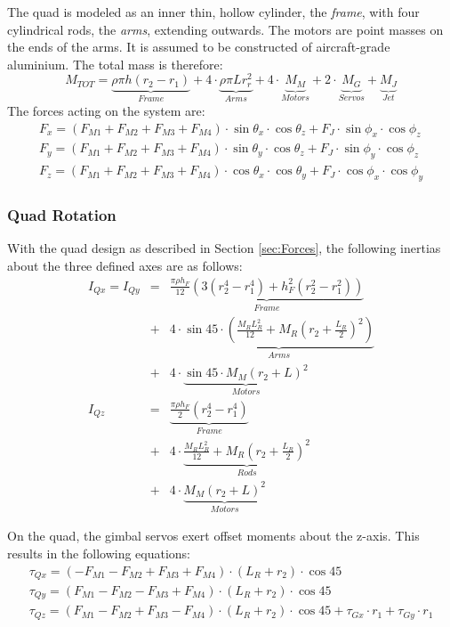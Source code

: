 \documentclass[11pt]{article}
\begin{document}
The quad is modeled as an inner thin, hollow cylinder, the \emph{frame}, with four cylindrical rods, the \emph{arms}, extending outwards. The motors are point masses on the ends of the arms. It is assumed to be constructed of aircraft-grade aluminium. The total mass is therefore:
\begin{equation}
    M_{TOT} = \underbrace{\rho\pi h (r_2-r_1)}_{Frame} + 4\cdot\underbrace{\rho\pi L r_r^2}_{Arms} + 4\cdot\underbrace{M_M}_{Motors} + 2\cdot\underbrace{M_G}_{Servos} + \underbrace{M_J}_{Jet} \label{eqn:total_mass}
\end{equation}
The forces acting on the system are:
\begin{eqnarray}
    F_x = (F_{M1} + F_{M2} + F_{M3} + F_{M4})\cdot\sin{\theta_x}\cdot\cos{\theta_z} +  F_J\cdot\sin{\phi_x}\cdot\cos{\phi_z} \\
    F_y = (F_{M1} + F_{M2} + F_{M3} + F_{M4})\cdot\sin{\theta_y}\cdot\cos{\theta_z} +  F_J\cdot\sin{\phi_y}\cdot\cos{\phi_z} \\
    F_z = (F_{M1} + F_{M2} + F_{M3} + F_{M4})\cdot\cos{\theta_x}\cdot\cos{\theta_y} +  F_J\cdot\cos{\phi_x}\cdot\cos{\phi_y}
\end{eqnarray}

\subsubsection{Quad Rotation}
With the quad design as described in Section \ref{sec:Forces}, the following inertias about the three defined axes are as follows:
\begin{eqnarray}
    I_{Qx} = I_{Qy} & = & \underbrace{\frac{\pi \rho h_F}{12}(3(r_2^4-r_1^4) + h_F^2(r_2^2-r_1^2))}_{Frame} \nonumber \\ & + & 4 \cdot \underbrace{\sin 45 \cdot (\frac{M_R L_R^2}{12}+M_R(r_2+\frac{L_R}{2})^2)}_{Arms} \nonumber \\ & + & 4 \cdot \underbrace{\sin 45 \cdot M_M(r_2+L)^2}_{Motors} \\
    I_{Qz} & = & \underbrace{\frac{\pi \rho h_F}{2}(r_2^4-r_1^4)}_{Frame} \nonumber \\ & + & 4 \cdot \underbrace{\frac{M_RL_R^2}{12} + M_R(r_2+\frac{L_R}{2})^2}_{Rods} \nonumber \\ & + & 4 \cdot \underbrace{M_M(r_2+L)^2}_{Motors}
\end{eqnarray}

On the quad, the gimbal servos exert offset moments about the z-axis. This results in the following equations:
\begin{eqnarray}
    \tau_{Qx} = (-F_{M1} - F_{M2} + F_{M3} + F_{M4})\cdot(L_R + r_2)\cdot \cos{45} \\
    \tau_{Qy} = (F_{M1} - F_{M2} - F_{M3} + F_{M4})\cdot(L_R + r_2)\cdot \cos{45} \\
    \tau_{Qz} = (F_{M1} - F_{M2} + F_{M3} - F_{M4})\cdot(L_R + r_2)\cdot \cos{45} + \tau_{Gx}\cdot r_1 + \tau_{Gy}\cdot r_1
\end{eqnarray}
\end{document}
